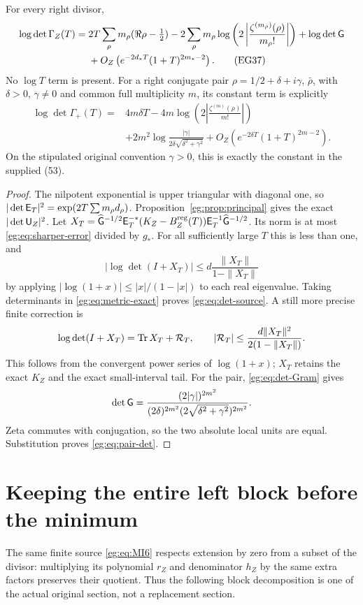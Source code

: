 \documentclass[11pt]{article}
\begin{document}
\begin{egtheorem}\label{eg:thm:det-source}
For every right divisor,
\begin{align}
 \log\det\Gamma_Z(T)
 ={}&2T\sum_\rho m_\rho(\Re\rho-\tfrac12)
 -2\sum_\rho m_\rho\log\left(2\left|
                 \frac{\zeta^{(m_\rho)}(\rho)}{m_\rho!}\right|\right)
 +\log\det\mathsf G\notag\\
 &+O_Z\left(e^{-2d_*T}(1+T)^{2m_*-2}\right).
 \tag{EG37}\label{eg:eq:det-source}
\end{align}
No $\log T$ term is present. For a right conjugate pair
$\rho=1/2+\delta+i\gamma$, $\bar\rho$, with $\delta>0$, $\gamma\ne0$
and common full multiplicity $m$, its constant term is explicitly
\[
 \begin{split}
 \log\det\Gamma_+(T)={}&4m\delta T
 -4m\log\left(2\left|\frac{\zeta^{(m)}(\rho)}{m!}\right|\right)\\
 &+2m^2\log\frac{|\gamma|}{2\delta\sqrt{\delta^2+\gamma^2}}
                  +O_Z(e^{-2\delta T}(1+T)^{2m-2}).
 \end{split}\tag{EG38}\label{eg:eq:pair-det}
\]
On the stipulated original convention $\gamma>0$, this is exactly
the constant in the supplied (53).
\end{egtheorem}
\begin{proof}
The nilpotent exponential is upper triangular with diagonal one, so
$|\det\mathsf E_T|^2=\exp(2T\sum m_\rho d_\rho)$.
Proposition~\ref{eg:prop:principal} gives the exact $|\det\mathsf U_Z|^2$.
Let
$X_T=\widehat{\mathsf G}^{-1/2}\mathsf E_T^{-*}
(K_Z-B_Z^{\rm reg}(T))\mathsf E_T^{-1}\widehat{\mathsf G}^{-1/2}$.
Its norm is at most \eqref{eg:eq:sharper-error} divided by $g_*$.
For all sufficiently large $T$ this is less than one, and
\[
 |\log\det(I+X_T)|\le d\frac{\|X_T\|}{1-\|X_T\|}
\]
by applying $|\log(1+x)|\le |x|/(1-|x|)$ to each real eigenvalue.
Taking determinants in \eqref{eg:eq:metric-exact} proves
\eqref{eg:eq:det-source}. A still more precise finite correction is
\[
 \log\det(I+X_T)=\operatorname{Tr} X_T+\mathcal R_T,\qquad
 |\mathcal R_T|\le\frac{d\|X_T\|^2}{2(1-\|X_T\|)}.
\]
This follows from the convergent power series of $\log(1+x)$;
$X_T$ retains the exact $K_Z$ and the exact small-interval tail.
For the pair, \eqref{eg:eq:det-Gram} gives
\[
 \det\mathsf G=\frac{(2|\gamma|)^{2m^2}}
                 {(2\delta)^{2m^2}(2\sqrt{\delta^2+\gamma^2})^{2m^2}}.
\]
Zeta commutes with conjugation, so the two absolute local units are
equal. Substitution proves \eqref{eg:eq:pair-det}.
\end{proof}

\section{Keeping the entire left block before the minimum}\label{eg:sec:left-quotient}
The same finite source \eqref{eg:eq:MI6} respects extension by zero
from a subset of the divisor: multiplying its polynomial $r_Z$ and
denominator $h_Z$ by the same extra factors preserves their quotient.
Thus the following block decomposition is one of the actual original
section, not a replacement section.
\end{document}
